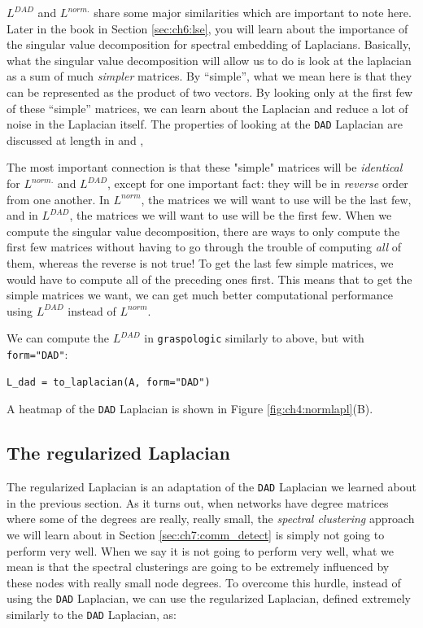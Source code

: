 $L^{DAD}$ and $L^{norm.}$ share some major similarities which are important to note here. Later in the book in Section \ref{sec:ch6:lse}, you will learn about the importance of the singular value decomposition for spectral embedding of Laplacians. Basically, what the singular value decomposition will allow us to do is look at the laplacian as a sum of much \emph{simpler} matrices. By ``simple'', what we mean here is that they can be represented as the product of two vectors. By looking only at the first few of these ``simple'' matrices, we can learn about the Laplacian and reduce a lot of noise in the Laplacian itself. The properties of looking at the \texttt{DAD} Laplacian are discussed at length in \cite{Chaudhuri2012Jun} and \cite{Amini2012Jul},

The most important connection is that these "simple" matrices will be \emph{identical} for $L^{norm.}$ and $L^{DAD}$, except for one important fact: they will be in \emph{reverse} order from one another. In $L^{norm}$, the matrices we will want to use will be the last few, and in $L^{DAD}$, the matrices we will want to use will be the first few. When we compute the singular value decomposition, there are ways to only compute the first few matrices without having to go through the trouble of computing \emph{all} of them, whereas the reverse is not true! To get the last few simple matrices, we would have to compute all of the preceding ones first. This means that to get the simple matrices we want, we can get much better computational performance using $L^{DAD}$ instead of $L^{norm}$.

We can compute the $L^{DAD}$ in \texttt{graspologic} similarly to above, but with \texttt{form="DAD"}:

\begin{lstlisting}[style=python]
L_dad = to_laplacian(A, form="DAD")
\end{lstlisting}

A heatmap of the \texttt{DAD} Laplacian is shown in Figure \ref{fig:ch4:normlapl}(B).

\subsection{The regularized Laplacian}
\label{ch4:mtx-rep:reg_laplacian}
The regularized Laplacian is an adaptation of the \texttt{DAD} Laplacian we learned about in the previous section. As it turns out, when networks have degree matrices where some of the degrees are really, really small, the \emph{spectral clustering} approach we will learn about in Section \ref{sec:ch7:comm_detect} is simply not going to perform very well. When we say it is not going to perform very well, what we mean is that the spectral clusterings are going to be extremely influenced by these nodes with really small node degrees. To overcome this hurdle, instead of using the \texttt{DAD} Laplacian, we can use the regularized Laplacian, defined extremely similarly to the \texttt{DAD} Laplacian, as:

